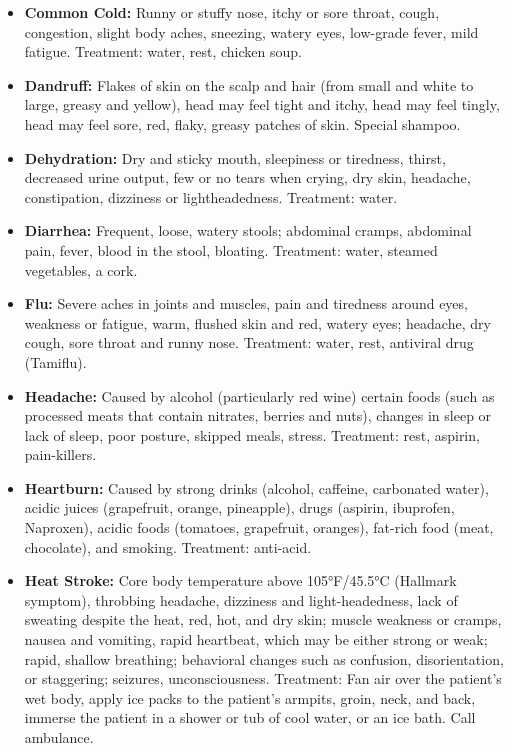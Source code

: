 \begin{itemize}
\item \textbf{Common Cold:} Runny or stuffy nose, itchy or sore throat, cough, congestion, slight body aches, sneezing, watery eyes, low-grade fever, mild fatigue. Treatment: water, rest, chicken soup.

\item \textbf{Dandruff:} Flakes of skin on the scalp and hair (from small and white to large, greasy and yellow), head may feel tight and itchy, head may feel tingly, head may feel sore, red, flaky, greasy patches of skin. Special shampoo.

\item \textbf{Dehydration:} Dry and sticky mouth, sleepiness or tiredness, thirst, decreased urine output, few or no tears when crying, dry skin, headache, constipation, dizziness or lightheadedness. Treatment: water.

\item \textbf{Diarrhea:} Frequent, loose, watery stools; abdominal cramps, abdominal pain, fever, blood in the stool, bloating. Treatment: water, steamed vegetables, a cork.

\item \textbf{Flu:} Severe aches in joints and muscles, pain and tiredness around eyes, weakness or fatigue, warm, flushed skin and red, watery eyes; headache, dry cough, sore throat and runny nose. Treatment: water, rest, antiviral drug (Tamiflu).

\item \textbf{Headache: } Caused by alcohol (particularly red wine) certain foods (such as processed meats that contain nitrates, berries and nuts), changes in sleep or lack of sleep, poor posture, skipped meals, stress. Treatment: rest, aspirin, pain-killers.

\item \textbf{Heartburn:} Caused by strong drinks (alcohol, caffeine, carbonated water), acidic juices (grapefruit, orange, pineapple), drugs (aspirin, ibuprofen, Naproxen), acidic foods (tomatoes, grapefruit, oranges), fat-rich food (meat, chocolate), and smoking. Treatment: anti-acid.

\item \textbf{Heat Stroke:} Core body temperature above 105°F/45.5°C (Hallmark symptom), throbbing headache, dizziness and light-headedness, lack of sweating despite the heat, red, hot, and dry skin; muscle weakness or cramps, nausea and vomiting, rapid heartbeat, which may be either strong or weak; rapid, shallow breathing; behavioral changes such as confusion, disorientation, or staggering; seizures, unconsciousness. Treatment: Fan air over the patient's wet body, apply ice packs to the patient's armpits, groin, neck, and back, immerse the patient in a shower or tub of cool water, or an ice bath. Call ambulance.


\end{itemize}
